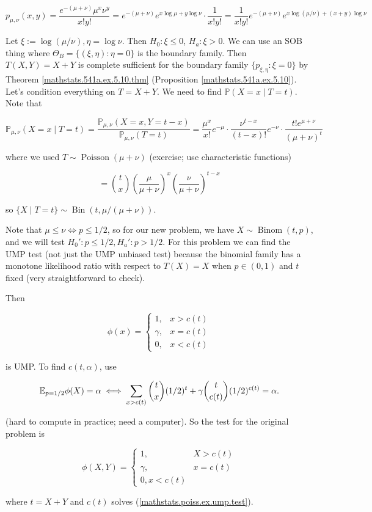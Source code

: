 \begin{solution}

\[
p_{\mu, \nu}(x,y) = \frac{e^{-(\mu + \nu)} \mu^x \nu^y}{x!y!} = e^{-(\mu + \nu)} e^{x \log \mu + y \log \nu} \cdot \frac{1}{x!y!} 
=  \frac{1}{x!y!}  e^{-(\mu + \nu)} e^{x \log (\mu/\nu) + (x+ y) \log \nu} 
\]

Let \(\xi := \log(\mu/\nu), \eta = \log \nu\). Then \(H_0: \xi \leq 0\), \(H_a: \xi > 0\). We can use an SOB thing where \(\Theta_B = \{ (\xi, \eta) : \eta = 0\}\) is the boundary family. Then \(T(X,Y) = X + Y \) is complete sufficient for the boundary family \(\{p_{\xi, \eta} : \xi = 0\}\) by Theorem \ref{mathstats.541a.ex.5.10.thm} (Proposition \ref{mathstats.541a.ex.5.10}). Let's condition everything on \(T = X + Y\). We need to find \(\mathbb{P}(X =x \mid T = t)\). Note that

\[
\mathbb{P}_{\mu, \nu} (X = x \mid T = t) = \frac{\mathbb{P}_{\mu, \nu} (X = x , Y = t - x) }{\mathbb{P}_{\mu, \nu} (T = t) } = \frac{\mu^x}{x!} e^{-\mu} \cdot \frac{ \nu^{t-x}}{(t-x)!} e^{-\nu} \cdot \frac{t! e^{\mu + \nu} }{(\mu + \nu)^t}
\]

where we used \(T \sim \operatorname{Poisson}(\mu + \nu)\) (exercise; use characteristic functions)

\[
= \binom{t}{x} \left( \frac{\mu}{\mu + \nu} \right)^x \left( \frac{\nu}{\mu + \nu} \right)^{t-x}
\]

so \(\{X \mid T = t\} \sim \operatorname{Bin}(t, \mu/(\mu + \nu))\). 

Note that \(\mu \leq \nu \iff p \leq 1/2\), so for our new problem, we have \(X \sim \operatorname{Binom}(t, p)\), and we will test \(H_0': p \leq 1/2, H_a': p > 1/2\). For this problem we can find the UMP test (not just the UMP unbiased test) because the binomial family has a monotone likelihood ratio with respect to \(T(X) = X\) when \(p \in (0,1)\) and \(t\) fixed (very straightforward to check). 

Then

\[
\phi(x) = \begin{cases}
1, & x > c(t) \\
\gamma, & x = c(t) \\
0, & x < c(t)
\end{cases}
\]

is UMP. To find \(c(t, \alpha)\), use

\begin{equation}\label{mathstats.poiss.ex.ump.test}
\E_{p = 1/2} \phi(X) = \alpha \iff \sum_{x > c(t)} \binom{t}{x} (1/2)^t + \gamma \binom{t}{c(t)} (1/2)^{c(t)} = \alpha.
\end{equation}

(hard to compute in practice; need a computer). So the test for the original problem is 

\[
\phi(X, Y) = \begin{cases}
1, & X > c(t) \\
\gamma, & x =c(t) \\
0, x < c(t)
\end{cases}
\]

where \(t = X + Y\) and \(c(t)\) solves (\ref{mathstats.poiss.ex.ump.test}).

\end{solution}
